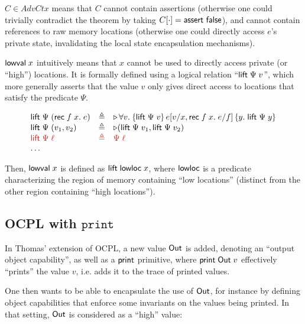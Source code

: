 \documentclass{article}
\newcommand{\I}[1]{\ensuremath{\mathtt{#1}}}
\begin{document}
$C \in AdvCtx$ means that $C$ cannot contain assertions (otherwise one could
trivially contradict the theorem by taking
$C[\cdot] = \textsf{assert false}$), and cannot contain references to raw
memory locations (otherwise one could directly access $e$'s private state,
invalidating the local state encapsulation mechanisms).

\newcommand{\lift}[2]{\textlog{lift}\; #1 \; #2}
\newcommand{\liftP}[1]{\lift{\Psi}{#1}}

$\textsf{lowval}\; x$ intuitively means that $x$ cannot be used to directly
access private (or ``high'') locations. It is formally defined using a logical
relation ``$\liftP{v}$'', which more generally asserts that the value $v$ only
gives direct access to locations that satisfy the predicate $\Psi$.

\[
  \begin{array}{lcl}
    \liftP (\textlog{rec}\; f\; x.\; e) & \eqdef
    & \later \forall v.\; \hoare{\liftP{v}}{e[v/x,\textlog{rec}\;f\;x.\; e/f]}{y.\; \liftP y} \\
    \liftP (v_{1}, v_{2}) & \eqdef & \later (\liftP v_{1}, \liftP v_{2}) \\
    \color{BrickRed} \liftP \ell & \color{BrickRed} \eqdef & \color{BrickRed} \Psi \; \ell \\
    \ldots
  \end{array}
\]

Then, $\textsf{lowval}\; x$ is defined as $\lift{\textlog{lowloc}}{x}$, where
$\textsf{lowloc}$ is a predicate characterizing the region of memory containing
``low locations'' (distinct from the other region containing ``high
locations'').

\subsection{OCPL with \I{print}}

\newcommand{\OutV}{\textlog{Out}}

In Thomas' extension of OCPL, a new value $\OutV$ is added, denoting an
``output object capability'', as well as a $\textsf{print}$ primitive, where
$\textlog{print}\; \OutV\; v$ effectively ``prints'' the value $v$, i.e. adds it
to the trace of printed values.

One then wants to be able to encapsulate the use of $\OutV$, for instance by
defining object capabilities that enforce some invariants on the values being
printed. In that setting, $\OutV$ is considered as a ``high'' value:
\end{document}

